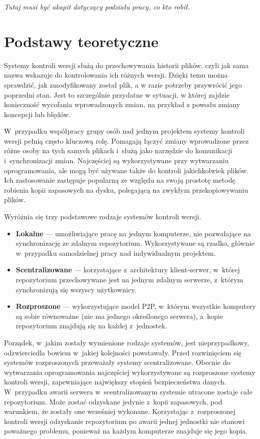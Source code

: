 \documentclass[12pt,a4paper,polish,thesis]{dcsbook}
\begin{document}
	\textit{Tutaj musi być akapit dotyczący podziału pracy, co kto robił.}

	\chapter{Podstawy teoretyczne} \label{Teoria}

	Systemy kontroli wersji służą do przechowywania historii plików, czyli jak sama nazwa wskazuje do kontrolowania ich różnych wersji. Dzięki temu można sprawdzić, jak zmodyfikowany został plik, a w razie potrzeby przywrócić jego poprzedni stan. Jest to szczególnie przydatne w sytuacji, w której zajdzie konieczność wycofania wprowadzonych zmian, na przykład z powodu zmiany koncepcji lub błędów.

	 W~przypadku współpracy grupy osób nad jednym projektem systemy kontroli wersji pełnią często kluczową rolę. Pomagają łączyć zmiany wprowadzone przez różne osoby na tych samych plikach i~służą jako narzędzie do komunikacji i~synchronizacji zmian. Najczęściej są wykorzystywane przy wytwarzaniu oprogramowania, ale mogą być używane także do kontroli jakichkolwiek plików. Ich zastosowanie zastępuje popularną ze względu na swoją prostotę metodę robienia kopii zapasowych na dysku, polegającą na zwykłym przekopiowywaniu plików.

	Wyróżnia się trzy podstawowe rodzaje systemów kontroli wersji.
	\begin{itemize}
		\item \textbf{Lokalne} --- umożliwiające pracę na jednym komputerze, nie pozwalające na synchronizację ze zdalnym repozytorium. Wykorzystywane są rzadko, głównie w~przypadku samodzielnej pracy nad indywidualnym projektem.
		\item \textbf{Scentralizowane} --- korzystające z~architektury klient-serwer, w~której repozytorium przechowywane jest na jednym zdalnym serwerze, z~którym synchronizują się wszyscy użytkownicy.
		\item \textbf{Rozproszone} --- wykorzystujące model P2P, w~którym wszystkie komputery są sobie równoważne (nie ma jednego określonego serwera), a~kopie repozytorium znajdują się na każdej z~jednostek.
	\end{itemize}

	Porządek, w~jakim zostały wymienione rodzaje systemów, jest nieprzypadkowy, odzwierciedla bowiem w~jakiej kolejności powstawały. Przed rozwinięciem się systemów rozproszonych przeważały systemy scentralizowane. Obecnie do wytwarzania oprogramowania najczęściej wykorzystywane są rozproszone systemy kontroli wersji, zapewniające największy stopień bezpieczeństwa danych. W~przypadku awarii serwera w~scentralizowanym systemie utracone zostaje całe repozytorium. Może zostać odzyskane jedynie z~kopii zapasowych, pod warunkiem, że zostały one wcześniej wykonane. Korzystając z~rozproszonej kontroli wersji odzyskanie repozytorium po awarii jednej jednostki nie stanowi poważnego problemu, ponieważ na każdym komputerze znajduje się jego kopia.
\end{document}

